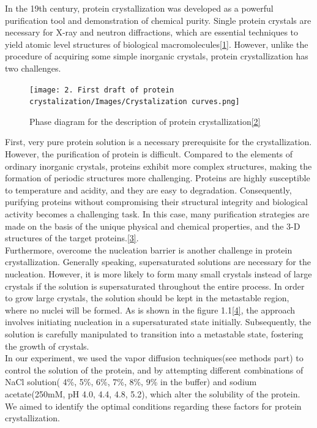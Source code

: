 \documentclass[a4paper,english,12pt,bibliography=totoc]{scrreprt}
\begin{document}
 In the 19th century, protein crystallization was developed as a powerful purification tool and demonstration of chemical purity. Single protein crystals are necessary for X-ray and neutron diffractions, which are essential techniques to yield atomic level structures of biological macromolecules\hyperref[sec:ref_1]{[1]}. However, unlike the procedure of acquiring some simple inorganic crystals, protein crystallization has two challenges.\\


\begin{figure}[H]
        \centering
        \texttt{[image: 2. First draft of protein crystalization/Images/Crystalization curves.png]}
	    \caption{Phase diagram for the description of protein crystallization\hyperref[sec:ref_2]{[2]}}
\end{figure}

First, very pure protein solution is a necessary prerequisite for the crystallization. However, the purification of protein is difficult. Compared to the elements of ordinary inorganic crystals, proteins exhibit more complex structures, making the formation of periodic structures more challenging. Proteins are highly susceptible to temperature and acidity, and they are easy to degradation. Consequently, purifying proteins without compromising their structural integrity and biological activity becomes a challenging task. In this case, many purification strategies are made on the basis of the unique physical and chemical properties, and the 3-D structures of the target proteins.\hyperref[sec:ref_3]{[3]}.\\

Furthermore, overcome the nucleation barrier is another challenge in protein crystallization. Generally speaking, supersaturated solutions are necessary for the nucleation. However, it is more likely to form many small crystals instead of large crystals if the solution is supersaturated throughout the entire process. In order to grow large crystals, the solution should be kept in the metastable region, where no nuclei will be formed. As is shown in the figure 1.1\hyperref[sec:ref_4]{[4]}, the approach involves initiating nucleation in a supersaturated state initially. Subsequently, the solution is carefully manipulated to transition into a metastable state, fostering the growth of crystals.\\

In our experiment, we used the vapor diffusion techniques(see methods part) to control the solution of the protein, and by attempting different combinations of NaCl solution( 4\%, 5\%, 6\%, 7\%, 8\%, 9\% in the buffer) and sodium acetate(250mM, pH 4.0, 4.4, 4.8, 5.2), which alter the solubility of the protein.  We aimed to identify the optimal conditions regarding these factors for protein crystallization.
\end{document}
